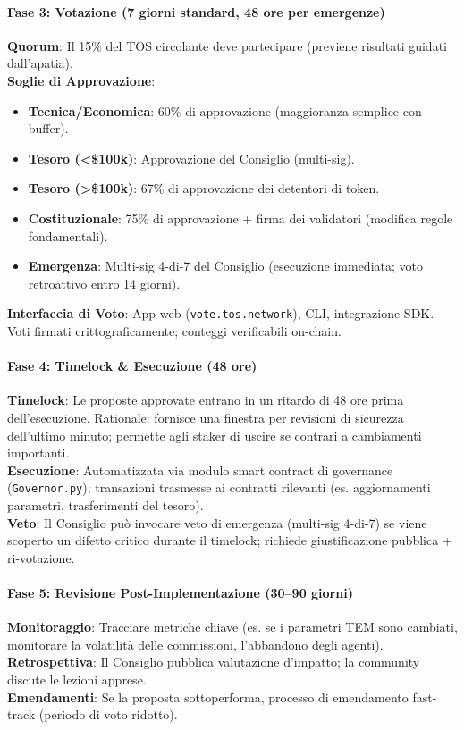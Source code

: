 \documentclass[11pt]{article}
\begin{document}
\begin{itemize}[noitemsep]
\paragraph{Fase 3: Votazione (7 giorni standard, 48 ore per emergenze)}
\textbf{Quorum}: Il 15\% del TOS circolante deve partecipare (previene risultati guidati dall'apatia).\\
\textbf{Soglie di Approvazione}:
\begin{itemize}[noitemsep]
  \item \textbf{Tecnica/Economica}: 60\% di approvazione (maggioranza semplice con buffer).
  \item \textbf{Tesoro (<\$100k)}: Approvazione del Consiglio (multi-sig).
  \item \textbf{Tesoro (>\$100k)}: 67\% di approvazione dei detentori di token.
  \item \textbf{Costituzionale}: 75\% di approvazione + firma dei validatori (modifica regole fondamentali).
  \item \textbf{Emergenza}: Multi-sig 4-di-7 del Consiglio (esecuzione immediata; voto retroattivo entro 14 giorni).
\end{itemize}
\textbf{Interfaccia di Voto}: App web (\texttt{vote.tos.network}), CLI, integrazione SDK. Voti firmati crittograficamente; conteggi verificabili on-chain.

\paragraph{Fase 4: Timelock \& Esecuzione (48 ore)}
\textbf{Timelock}: Le proposte approvate entrano in un ritardo di 48 ore prima dell'esecuzione. Rationale: fornisce una finestra per revisioni di sicurezza dell'ultimo minuto; permette agli staker di uscire se contrari a cambiamenti importanti.\\
\textbf{Esecuzione}: Automatizzata via modulo smart contract di governance (\texttt{Governor.py}); transazioni trasmesse ai contratti rilevanti (es. aggiornamenti parametri, trasferimenti del tesoro).\\
\textbf{Veto}: Il Consiglio può invocare veto di emergenza (multi-sig 4-di-7) se viene scoperto un difetto critico durante il timelock; richiede giustificazione pubblica + ri-votazione.

\paragraph{Fase 5: Revisione Post-Implementazione (30--90 giorni)}
\textbf{Monitoraggio}: Tracciare metriche chiave (es. se i parametri TEM sono cambiati, monitorare la volatilità delle commissioni, l'abbandono degli agenti).\\
\textbf{Retrospettiva}: Il Consiglio pubblica valutazione d'impatto; la community discute le lezioni apprese.\\
\textbf{Emendamenti}: Se la proposta sottoperforma, processo di emendamento fast-track (periodo di voto ridotto).


\end{itemize}
\end{document}
